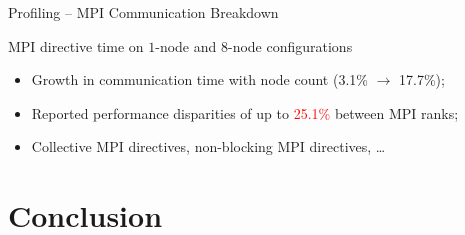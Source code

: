 \documentclass[aspectratio=169, handout]{beamer}
\begin{document}
\begin{frame}{Profiling -- MPI Communication Breakdown}
    \begin{center}

        \vspace{0.5\baselineskip}
        \small MPI directive time on $1$-node and $8$-node configurations
    \end{center}

    \begin{itemize}
        \item Growth in communication time with node count (3.1\% $\rightarrow$ 17.7\%);
        \item Reported performance disparities of up to \textcolor{red}{25.1\%} between MPI ranks;
        \item Collective MPI directives, non-blocking MPI directives, \ldots
    \end{itemize}
\end{frame}

\section{Conclusion}
\end{document}
